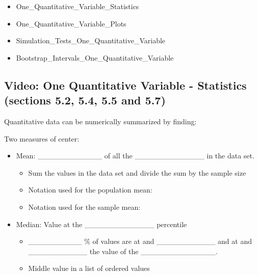 \documentclass[
]{report}
\begin{document}
\begin{itemize}
\item
  One\_Quantitative\_Variable\_Statistics
\item
  One\_Quantitative\_Variable\_Plots
\item
  Simulation\_Tests\_One\_Quantitative\_Variable
\item
  Bootstrap\_Intervals\_One\_Quantitative\_Variable
\end{itemize}


\subsection*{Video: One Quantitative Variable - Statistics (sections 5.2, 5.4, 5.5 and 5.7)}\label{video-one-quantitative-variable---statistics-sections-5.2-5.4-5.5-and-5.7}


Quantitative data can be numerically summarized by finding:

Two measures of center:

\begin{itemize}
\item
  Mean: \_\_\_\_\_\_\_\_\_\_\_\_ of all the \_\_\_\_\_\_\_\_\_\_\_\_\_ in the data set.

  \begin{itemize}
  \item
    Sum the values in the data set and divide the sum by the sample size
  \item
    Notation used for the population mean:
  \item
    Notation used for the sample mean:
  \end{itemize}
\end{itemize}

\vspace{0.1in}

\begin{itemize}
\item
  Median: Value at the \_\_\_\_\_\_\_\_\_\_\_\_\_ percentile

  \begin{itemize}
  \item
    \_\_\_\_\_\_\_\_\_\_ \% of values are at and \_\_\_\_\_\_\_\_\_\_\_ and at and \_\_\_\_\_\_\_\_\_\_\_ the value of the \_\_\_\_\_\_\_\_\_\_\_\_\_\_.
  \item
    Middle value in a list of ordered values
  \end{itemize}
\end{itemize}
\end{document}
